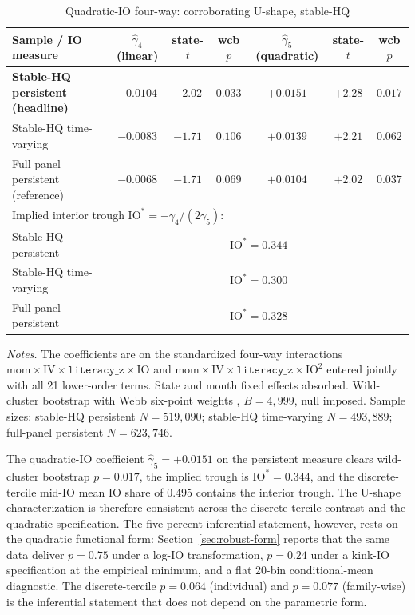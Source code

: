 \begin{table}[t]
\centering
\caption{Quadratic-IO four-way: corroborating U-shape, stable-HQ}
\label{tab:headline_quadratic}
\footnotesize
\begin{minipage}{\textwidth}
\centering
\begin{tabular}{lcccccc}
\toprule
Sample / IO measure & $\hat\gamma_{4}$ (linear) & state-$t$ & wcb $p$ & $\hat\gamma_{5}$ (quadratic) & state-$t$ & wcb $p$ \\
\midrule
\textbf{Stable-HQ persistent (headline)} & $\mathbf{-0.0104}$ & $\mathbf{-2.02}$ & $\mathbf{0.033}$ & $\mathbf{+0.0151}$ & $\mathbf{+2.28}$ & $\mathbf{0.017}$ \\
Stable-HQ time-varying                   & $-0.0083$ & $-1.71$ & $0.106$ & $+0.0139$ & $+2.21$ & $0.062$ \\
Full panel persistent (reference)        & $-0.0068$ & $-1.71$ & $0.069$ & $+0.0104$ & $+2.02$ & $0.037$ \\
\midrule
\multicolumn{7}{l}{Implied interior trough $\mathrm{IO}^{\ast} = -\gamma_{4}/(2\gamma_{5})$:} \\
Stable-HQ persistent & \multicolumn{6}{c}{$\mathrm{IO}^{\ast} = 0.344$} \\
Stable-HQ time-varying & \multicolumn{6}{c}{$\mathrm{IO}^{\ast} = 0.300$} \\
Full panel persistent & \multicolumn{6}{c}{$\mathrm{IO}^{\ast} = 0.328$} \\
\bottomrule
\end{tabular}
\end{minipage}

\medskip
{\footnotesize\textit{Notes.} The coefficients are on the standardized four-way interactions $\mathrm{mom}\times\mathrm{IV}\times\mathtt{literacy\_z}\times\mathrm{IO}$ and $\mathrm{mom}\times\mathrm{IV}\times\mathtt{literacy\_z}\times\mathrm{IO}^{2}$ entered jointly with all 21 lower-order terms. State and month fixed effects absorbed. Wild-cluster bootstrap with Webb six-point weights \citep{webb2014, cameronGelbachMiller2008}, $B = 4{,}999$, null imposed. Sample sizes: stable-HQ persistent $N = 519{,}090$; stable-HQ time-varying $N = 493{,}889$; full-panel persistent $N = 623{,}746$.}
\end{table}

The quadratic-IO coefficient $\hat\gamma_{5} = +0.0151$ on the persistent measure clears wild-cluster bootstrap $p = 0.017$, the implied trough is $\mathrm{IO}^{\ast} = 0.344$, and the discrete-tercile mid-IO mean IO share of $0.495$ contains the interior trough. The U-shape characterization is therefore consistent across the discrete-tercile contrast and the quadratic specification. The five-percent inferential statement, however, rests on the quadratic functional form: Section~\ref{sec:robust-form} reports that the same data deliver $p = 0.75$ under a log-IO transformation, $p = 0.24$ under a kink-IO specification at the empirical minimum, and a flat 20-bin conditional-mean diagnostic. The discrete-tercile $p = 0.064$ (individual) and $p = 0.077$ (family-wise) is the inferential statement that does not depend on the parametric form.

